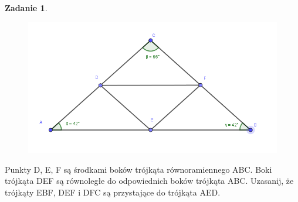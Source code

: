 \documentclass[11pt]{article}
\theoremstyle{definition}
\newtheorem{zad}{Zadanie}
\numberwithin{zad}{section}
\begin{document}
\begin{zad}

\begin{figure}[h]
\centering
\includegraphics[width=1\linewidth]{triforce.png}
\end{figure}

Punkty D, E, F są środkami boków trójkąta równoramiennego ABC. Boki trójkąta DEF są równoległe do odpowiednich boków trójkąta ABC. Uzasanij, że trójkąty EBF, DEF i DFC są przystające do trójkąta AED.
\end{zad}
\end{document}
